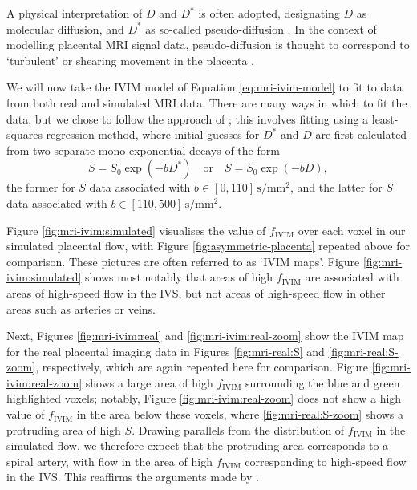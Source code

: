         A physical interpretation of $D$ and $D^*$ is often adopted, designating $D$ as molecular diffusion, and $D^*$ as so-called pseudo-diffusion \cite{lebihanWhatCanWe2019}. In the context of modelling placental MRI signal data, pseudo-diffusion is thought to correspond to `turbulent' or shearing movement in the placenta \cite{dellschaftHaemodynamicsHumanPlacenta2020}.        

        We will now take the IVIM model of Equation \eqref{eq:mri-ivim-model} to fit to data from both real and simulated MRI data. There are many ways in which to fit the data, but we chose to follow the approach of \citeauthor{lebihanWhatCanWe2019} \cite{lebihanWhatCanWe2019}; this involves fitting using a least-squares regression method, where initial guesses for $D^*$ and $D$ are first calculated from two separate mono-exponential decays of the form 
        \begin{equation*}
            S = S_0 \exp(-b D^*) \quad \text{or} \quad S = S_0 \exp(-b D),
        \end{equation*}
        the former for $S$ data associated with $b \in [0, 110]\,\unit{\second\per\milli\metre^2}$, and the latter for $S$ data associated with $b \in [110, 500]\,\unit{\second\per\milli\metre^2}$.
        
        Figure \ref{fig:mri-ivim:simulated} visualises the value of $f_\text{IVIM}$ over each voxel in our simulated placental flow, with Figure \ref{fig:asymmetric-placenta} repeated above for comparison. These pictures are often referred to as `IVIM maps'. Figure \ref{fig:mri-ivim:simulated} shows most notably that areas of high $f_\text{IVIM}$ are associated with areas of high-speed flow in the IVS, but not areas of high-speed flow in other areas such as arteries or veins.
        
        Next, Figures \ref{fig:mri-ivim:real} and \ref{fig:mri-ivim:real-zoom} show the IVIM map for the real placental imaging data in Figures \ref{fig:mri-real:S} and \ref{fig:mri-real:S-zoom}, respectively, which are again repeated here for comparison. Figure \ref{fig:mri-ivim:real-zoom} shows a large area of high $f_\text{IVIM}$ surrounding the blue and green highlighted voxels; notably, Figure \ref{fig:mri-ivim:real-zoom} does not show a high value of $f_\text{IVIM}$ in the area below these voxels, where \ref{fig:mri-real:S-zoom} shows a protruding area of high $S$. Drawing parallels from the distribution of $f_\text{IVIM}$ in the simulated flow, we therefore expect that the protruding area corresponds to a spiral artery, with flow in the area of high $f_\text{IVIM}$ corresponding to high-speed flow in the IVS. This reaffirms the arguments made by \citeauthor{dellschaftHaemodynamicsHumanPlacenta2020} \cite{dellschaftHaemodynamicsHumanPlacenta2020}.

